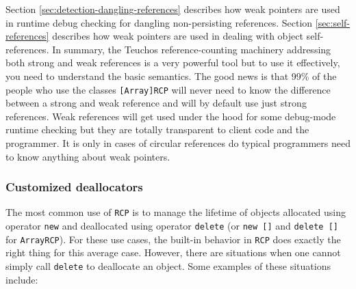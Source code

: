 \documentclass[pdf,ps2pdf,11pt]{SANDreport}
\begin{document}
Section {}\ref{sec:detection-dangling-references} describes how weak
pointers are used in runtime debug checking for dangling
non-persisting references.  Section {}\ref{sec:self-references}
describes how weak pointers are used in dealing with object
self-references.  In summary, the Teuchos reference-counting machinery
addressing both strong and weak references is a very powerful tool but
to use it effectively, you need to understand the basic semantics.
The good news is that 99\% of the people who use the classes
{}\texttt{[Array]RCP} will never need to know the difference between a
strong and weak reference and will by default use just strong
references.  Weak references will get used under the hood for some
debug-mode runtime checking but they are totally transparent to client
code and the programmer.  It is only in cases of circular references
do typical programmers need to know anything about weak pointers.


%
{}\subsubsection{Customized deallocators}
\label{sec:deallocators}
%

The most common use of {}\texttt{RCP} is to manage the lifetime of
objects allocated using operator {}\texttt{new} and deallocated using
operator {}\texttt{delete} (or {}\texttt{new []} and {}\texttt{delete
[]} for {}\texttt{ArrayRCP}).  For these use cases, the built-in
behavior in {}\texttt{RCP} does exactly the right thing for this
average case.  However, there are situations when one cannot simply
call {}\texttt{delete} to deallocate an object.  Some examples of
these situations include:
\end{document}
